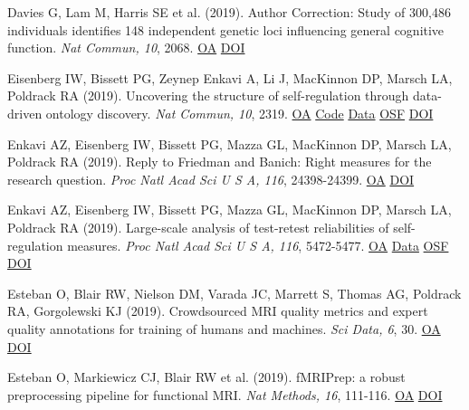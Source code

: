 \documentclass[10pt, letterpaper]{article}
\begin{document}
Davies G, Lam M, Harris SE et al. (2019). Author Correction: Study of 300,486 individuals identifies 148 independent genetic loci influencing general cognitive function. \textit{Nat Commun, 10}, 2068. \href{https://www.ncbi.nlm.nih.gov/pmc/articles/PMC6494826}{OA} \href{http://dx.doi.org/10.1038/s41467-019-10160-w}{DOI} \vspace{2mm}

Eisenberg IW, Bissett PG, Zeynep Enkavi A, Li J, MacKinnon DP, Marsch LA, Poldrack RA (2019). Uncovering the structure of self-regulation through data-driven ontology discovery. \textit{Nat Commun, 10}, 2319. \href{https://www.ncbi.nlm.nih.gov/pmc/articles/PMC6534563}{OA} \href{https://github.com/IanEisenberg/Self_Regulation_Ontology}{Code} \href{https://github.com/IanEisenberg/Self_Regulation_Ontology/tree/master/Data}{Data} \href{https://osf.io/zk6w9/}{OSF} \href{http://dx.doi.org/10.1038/s41467-019-10301-1}{DOI} \vspace{2mm}

Enkavi AZ, Eisenberg IW, Bissett PG, Mazza GL, MacKinnon DP, Marsch LA, Poldrack RA (2019). Reply to Friedman and Banich: Right measures for the research question. \textit{Proc Natl Acad Sci U S A, 116}, 24398-24399. \href{https://www.ncbi.nlm.nih.gov/pmc/articles/PMC6900533}{OA} \href{http://dx.doi.org/10.1073/pnas.1917123116}{DOI} \vspace{2mm}

Enkavi AZ, Eisenberg IW, Bissett PG, Mazza GL, MacKinnon DP, Marsch LA, Poldrack RA (2019). Large-scale analysis of test-retest reliabilities of self-regulation measures. \textit{Proc Natl Acad Sci U S A, 116}, 5472-5477. \href{https://www.ncbi.nlm.nih.gov/pmc/articles/PMC6431228}{OA} \href{https://github.com/IanEisenberg/Self_Regulation_Ontology/tree/master/Data}{Data} \href{https://osf.io/5mjns/}{OSF} \href{http://dx.doi.org/10.1073/pnas.1818430116}{DOI} \vspace{2mm}

Esteban O, Blair RW, Nielson DM, Varada JC, Marrett S, Thomas AG, Poldrack RA, Gorgolewski KJ (2019). Crowdsourced MRI quality metrics and expert quality annotations for training of humans and machines. \textit{Sci Data, 6}, 30. \href{https://www.ncbi.nlm.nih.gov/pmc/articles/PMC6472378}{OA} \href{http://dx.doi.org/10.1038/s41597-019-0035-4}{DOI} \vspace{2mm}

Esteban O, Markiewicz CJ, Blair RW et al. (2019). fMRIPrep: a robust preprocessing pipeline for functional MRI. \textit{Nat Methods, 16}, 111-116. \href{https://www.ncbi.nlm.nih.gov/pmc/articles/PMC6319393}{OA} \href{http://dx.doi.org/10.1038/s41592-018-0235-4}{DOI} \vspace{2mm}
\end{document}
